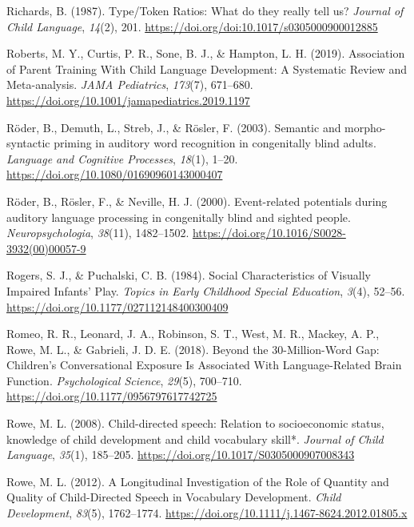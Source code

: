 \documentclass[
  man,floatsintext]{apa6}
\newlength{\cslhangindent}
\newlength{\cslentryspacingunit} %
\newenvironment{CSLReferences}[2] %
 {%
  \setlength{\parindent}{0pt}
  \ifodd #1
  \let\oldpar\par
  \def\par{\hangindent=\cslhangindent\oldpar}
  \fi
  \setlength{\parskip}{#2\cslentryspacingunit}
 }%
 {}
\begin{document}
\begin{CSLReferences}{1}{0}
\leavevmode{}%
Richards, B. (1987). Type/{Token Ratios}: What do they really tell us? \emph{Journal of Child Language}, \emph{14}(2), 201. \url{https://doi.org/doi:10.1017/s0305000900012885}

\leavevmode{}%
Roberts, M. Y., Curtis, P. R., Sone, B. J., \& Hampton, L. H. (2019). Association of {Parent Training With Child Language Development}: {A Systematic Review} and {Meta-analysis}. \emph{JAMA Pediatrics}, \emph{173}(7), 671--680. \url{https://doi.org/10.1001/jamapediatrics.2019.1197}

\leavevmode{}%
Röder, B., Demuth, L., Streb, J., \& Rösler, F. (2003). Semantic and morpho-syntactic priming in auditory word recognition in congenitally blind adults. \emph{Language and Cognitive Processes}, \emph{18}(1), 1--20. \url{https://doi.org/10.1080/01690960143000407}

\leavevmode{}%
Röder, B., Rösler, F., \& Neville, H. J. (2000). Event-related potentials during auditory language processing in congenitally blind and sighted people. \emph{Neuropsychologia}, \emph{38}(11), 1482--1502. \url{https://doi.org/10.1016/S0028-3932(00)00057-9}

\leavevmode{}%
Rogers, S. J., \& Puchalski, C. B. (1984). Social {Characteristics} of {Visually Impaired Infants}' {Play}. \emph{Topics in Early Childhood Special Education}, \emph{3}(4), 52--56. \url{https://doi.org/10.1177/027112148400300409}

\leavevmode{}%
Romeo, R. R., Leonard, J. A., Robinson, S. T., West, M. R., Mackey, A. P., Rowe, M. L., \& Gabrieli, J. D. E. (2018). Beyond the 30-{Million-Word Gap}: {Children}'s {Conversational Exposure Is Associated With Language-Related Brain Function}. \emph{Psychological Science}, \emph{29}(5), 700--710. \url{https://doi.org/10.1177/0956797617742725}

\leavevmode{}%
Rowe, M. L. (2008). Child-directed speech: Relation to socioeconomic status, knowledge of child development and child vocabulary skill*. \emph{Journal of Child Language}, \emph{35}(1), 185--205. \url{https://doi.org/10.1017/S0305000907008343}

\leavevmode{}%
Rowe, M. L. (2012). A {Longitudinal Investigation} of the {Role} of {Quantity} and {Quality} of {Child-Directed Speech} in {Vocabulary Development}. \emph{Child Development}, \emph{83}(5), 1762--1774. \url{https://doi.org/10.1111/j.1467-8624.2012.01805.x}


\end{CSLReferences}
\end{document}
